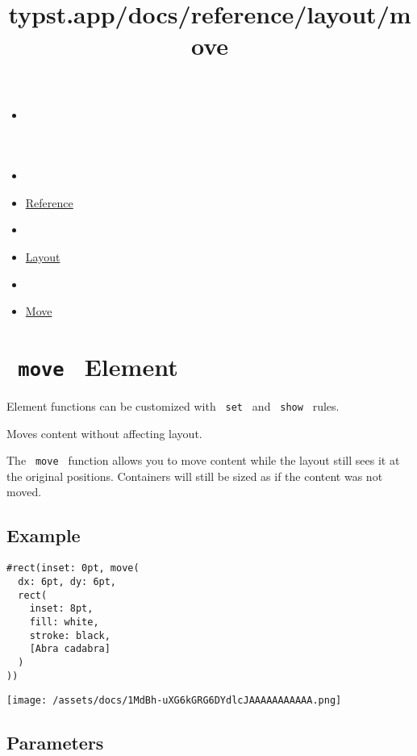 \title{typst.app/docs/reference/layout/move}

\begin{itemize}
\tightlist
\item
  \href{/docs}{}
\item
  
\item
  \href{/docs/reference/}{Reference}
\item
  
\item
  \href{/docs/reference/layout/}{Layout}
\item
  
\item
  \href{/docs/reference/layout/move/}{Move}
\end{itemize}

\section{\texorpdfstring{\texttt{\ move\ } {{ Element
}}}{ move   Element }}\label{summary}

\label{element-tooltip}
Element functions can be customized with \texttt{\ set\ } and
\texttt{\ show\ } rules.

Moves content without affecting layout.

The \texttt{\ move\ } function allows you to move content while the
layout still \textquotesingle sees\textquotesingle{} it at the original
positions. Containers will still be sized as if the content was not
moved.

\subsection{Example}\label{example}

\begin{verbatim}
#rect(inset: 0pt, move(
  dx: 6pt, dy: 6pt,
  rect(
    inset: 8pt,
    fill: white,
    stroke: black,
    [Abra cadabra]
  )
))
\end{verbatim}

\texttt{[image: /assets/docs/1MdBh-uXG6kGRG6DYdlcJAAAAAAAAAAA.png]}

\subsection{\texorpdfstring{{ Parameters
}}{ Parameters }}\label{parameters}

